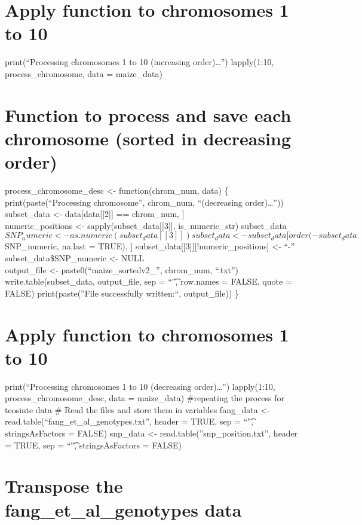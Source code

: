 \documentclass[
]{article}
\begin{document}
\section{Apply function to chromosomes 1 to
10}\label{apply-function-to-chromosomes-1-to-10}

print(``Processing chromosomes 1 to 10 (increasing order)\ldots{}'')
lapply(1:10, process\_chromosome, data = maize\_data)

\section{Function to process and save each chromosome (sorted in
decreasing
order)}\label{function-to-process-and-save-each-chromosome-sorted-in-decreasing-order}

process\_chromosome\_desc \textless- function(chrom\_num, data) \{
print(paste(``Processing chromosome'', chrom\_num, ``(decreasing
order)\ldots{}'')) subset\_data \textless- data{[}data{[}{[}2{]}{]} ==
chrom\_num, {]}\\
numeric\_positions \textless- sapply(subset\_data{[}{[}3{]}{]},
is\_numeric\_str)
subset\_data\(SNP_numeric <- as.numeric(subset_data[[3]])
  subset_data <- subset_data[order(-subset_data\)SNP\_numeric, na.last =
TRUE), {]} subset\_data{[}{[}3{]}{]}{[}!numeric\_positions{]} \textless-
``-'' subset\_data\$SNP\_numeric \textless- NULL\\
output\_file \textless- paste0(``maize\_sortedv2\_'', chrom\_num,
``.txt'') write.table(subset\_data, output\_file, sep = ``\t", row.names
= FALSE, quote = FALSE) print(paste(''File successfully written:``,
output\_file)) \}

\section{Apply function to chromosomes 1 to
10}\label{apply-function-to-chromosomes-1-to-10-1}

print(``Processing chromosomes 1 to 10 (decreasing order)\ldots{}'')
lapply(1:10, process\_chromosome\_desc, data = maize\_data) \#repeating
the process for teosinte data \# Read the files and store them in
variables fang\_data \textless-
read.table(``fang\_et\_al\_genotypes.txt'', header = TRUE, sep = ``\t",
stringsAsFactors = FALSE) snp\_data \textless-
read.table(''snp\_position.txt'', header = TRUE, sep = ``\t",
stringsAsFactors = FALSE)

\section{Transpose the fang\_et\_al\_genotypes
data}\label{transpose-the-fang_et_al_genotypes-data-1}
\end{document}
